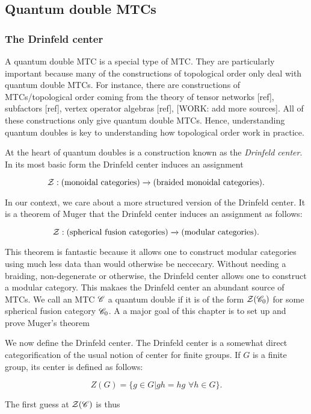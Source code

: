\subsection{Quantum double MTCs}

\subsubsection{The Drinfeld center}

A quantum double MTC is a special type of MTC. They are particularly important because many of the constructions of topological order only deal with quantum double MTCs. For instance, there are constructions of MTCs/topological order coming from the theory of tensor networks [ref], subfactors [ref], vertex operator algebras [ref], [WORK: add more sources]. All of these constructions only give quantum double MTCs. Hence, understanding quantum doubles is key to understanding how topological order work in practice.

At the heart of quantum doubles is a construction known as the \textit{Drinfeld center}. In its most basic form the Drinfeld center induces an assignment

$$\mathcal{Z}: (\text{monoidal categories})\xrightarrow{}(\text{braided monoidal categories}).$$

In our context, we care about a more structured version of the Drinfeld center. It is a theorem of Muger that the Drinfeld center induces an assignment as follows:

$$\mathcal{Z}: (\text{spherical fusion categories})\xrightarrow{}(\text{modular categories}).$$

This theorem is fantastic because it allows one to construct modular categories using much less data than would otherwise be neccecary. Without needing a braiding, non-degenerate or otherwise, the Drinfeld center allows one to construct a modular category. This makaes the Drinfeld center an abundant source of MTCs. We call an MTC $\mathscr{C}$ a quantum double if it is of the form $\mathcal{Z}(\mathscr{C}_0)$ for some spherical fusion category $\mathscr{C}_0$. A a major goal of this chapter is to set up and prove Muger's theorem

We now define the Drinfeld center. The Drinfeld center is a somewhat direct categorification of the usual notion of center for finite groups. If $G$ is a finite group, its center is defined as follows:

$$Z(G)=\{g\in G | gh=hg \,\, \forall h\in G\}.$$

The first guess at $\mathcal{Z}(\mathscr{C})$ is thus

